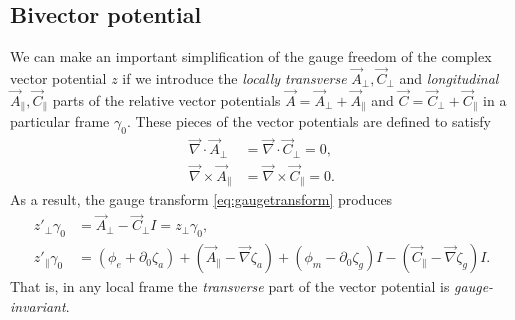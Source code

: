\documentclass[1p,sort&compress]{elsarticle}
\numberwithin{equation}{section}
\newcommand{\rv}[1]{\vec{#1}}
\begin{document}

\subsection{Bivector potential}\label{sec:bivectorpotential}


We can make an important simplification of the gauge freedom of the complex vector potential $z$ if we introduce the \emph{locally transverse} $\rv{A}_\perp,\rv{C}_\perp$ and \emph{longitudinal} $\rv{A}_\parallel,\rv{C}_\parallel$ parts of the relative vector potentials $\rv{A} = \rv{A}_\perp + \rv{A}_\parallel$ and $\rv{C} = \rv{C}_\perp + \rv{C}_\parallel$ in a particular frame $\gamma_0$.  These pieces of the vector potentials are defined to satisfy 
\begin{align}
  \rv{\nabla}\cdot\rv{A}_\perp &= \rv{\nabla}\cdot\rv{C}_\perp = 0, \\
  \rv{\nabla}\times\rv{A}_\parallel &= \rv{\nabla}\times\rv{C}_\parallel = 0.
\end{align}
As a result, the gauge transform \eqref{eq:gaugetransform} produces
\begin{align}\label{eq:gaugetransformperp}
  z'_{\perp}\gamma_0 &= \rv{A}_\perp - \rv{C}_\perp I = z_\perp \gamma_0, \\
  \label{eq:gaugetransformpar}
  z'_{\parallel}\gamma_0 &= (\phi_e + \partial_0 \zeta_a) + (\rv{A}_\parallel - \rv{\nabla}\zeta_a) + (\phi_m - \partial_0 \zeta_g)I - (\rv{C}_\parallel - \rv{\nabla}\zeta_g)I.
\end{align}
That is, in any local frame the \emph{transverse} part of the vector potential is \emph{gauge-invariant}.  
\end{document}
